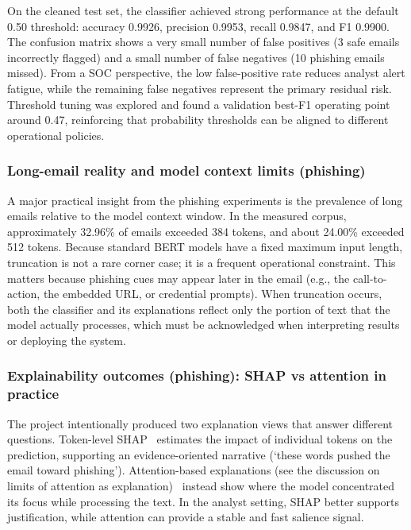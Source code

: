 \documentclass[conference]{IEEEtran}
\begin{document}
On the cleaned test set, the classifier achieved strong performance at the default 0.50 threshold: accuracy 0.9926, precision 0.9953, recall 0.9847, and F1 0.9900. The confusion matrix shows a very small number of false positives (3 safe emails incorrectly flagged) and a small number of false negatives (10 phishing emails missed). From a SOC perspective, the low false-positive rate reduces analyst alert fatigue, while the remaining false negatives represent the primary residual risk. Threshold tuning was explored and found a validation best-F1 operating point around 0.47, reinforcing that probability thresholds can be aligned to different operational policies.

\subsubsection{Long-email reality and model context limits (phishing)}

A major practical insight from the phishing experiments is the prevalence of long emails relative to the model context window. In the measured corpus, approximately 32.96\% of emails exceeded 384 tokens, and about 24.00\% exceeded 512 tokens. Because standard BERT models have a fixed maximum input length, truncation is not a rare corner case; it is a frequent operational constraint. This matters because phishing cues may appear later in the email (e.g., the call-to-action, the embedded URL, or credential prompts). When truncation occurs, both the classifier and its explanations reflect only the portion of text that the model actually processes, which must be acknowledged when interpreting results or deploying the system.

\subsubsection{Explainability outcomes (phishing): SHAP vs attention in practice}

The project intentionally produced two explanation views that answer different questions. Token-level SHAP~\cite{LL2017} estimates the impact of individual tokens on the prediction, supporting an evidence-oriented narrative (‘these words pushed the email toward phishing’). Attention-based explanations (see the discussion on limits of attention as explanation)~\cite{JW2019} instead show where the model concentrated its focus while processing the text. In the analyst setting, SHAP better supports justification, while attention can provide a stable and fast salience signal.
\end{document}
